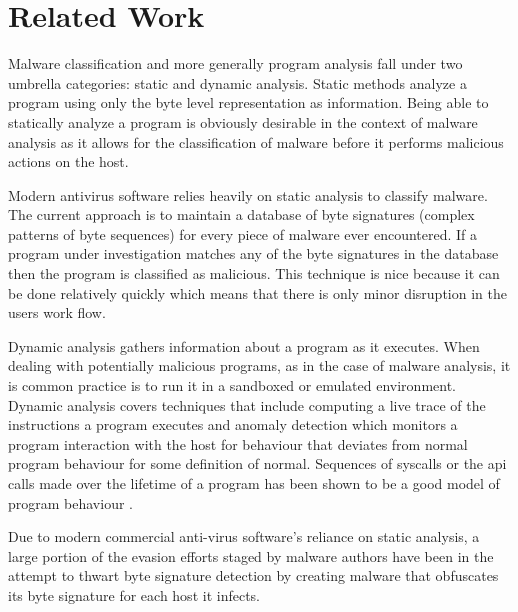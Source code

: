 \chapter{Related Work}

    Malware classification and more generally program analysis fall under two
    umbrella categories: static and dynamic analysis. Static methods analyze a
    program using only the byte level representation as information. Being able
    to statically analyze a program is obviously desirable in the context of
    malware analysis as it allows for the classification of malware before it
    performs malicious actions on the host.
    
    Modern antivirus software relies heavily on static analysis to classify
    malware. The current approach is to maintain a database of byte signatures
    (complex patterns of byte sequences) for every piece of malware ever
    encountered. If a program under investigation matches any of the byte
    signatures in the database then the program is classified as malicious.
    This technique is nice because it can be done relatively quickly which means
    that there is only minor disruption in the users work flow.

    Dynamic analysis gathers information about a program as it executes. When
    dealing with potentially malicious programs, as in the case of malware
    analysis, it is common practice is to run it in a sandboxed or emulated
    environment. Dynamic analysis covers techniques that include computing a
    live trace of the instructions a program executes and anomaly detection
    which monitors a program interaction with the host for behaviour that
    deviates from normal program behaviour for some definition of normal.
    Sequences of syscalls or the api calls made over the lifetime of a program
    has been shown to be a good model of program behaviour \cite{api_calls}.

    Due to modern commercial anti-virus software's reliance on static analysis,
    a large portion of the evasion efforts staged by malware authors have been
    in the attempt to thwart byte signature detection by creating malware that
    obfuscates its byte signature for each host it infects.

